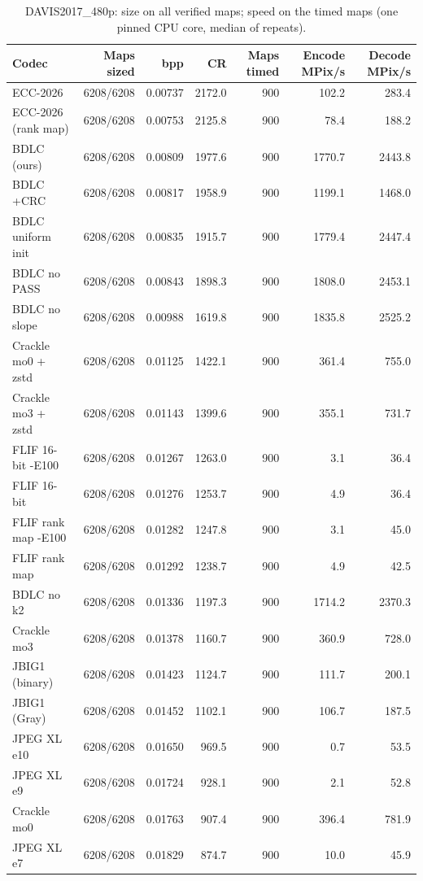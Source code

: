 \begin{table}[t]
\centering
\caption{DAVIS2017\_480p: size on all verified maps; speed on the timed maps (one pinned CPU core, median of repeats).}
\begin{tabular}{lrrrrrr}
\hline
Codec & Maps sized & bpp & CR & Maps timed & Encode MPix/s & Decode MPix/s \\
\hline
ECC-2026 & 6208/6208 & 0.00737 & 2172.0 & 900 & 102.2 & 283.4 \\
ECC-2026 (rank map) & 6208/6208 & 0.00753 & 2125.8 & 900 & 78.4 & 188.2 \\
BDLC (ours) & 6208/6208 & 0.00809 & 1977.6 & 900 & 1770.7 & 2443.8 \\
BDLC +CRC & 6208/6208 & 0.00817 & 1958.9 & 900 & 1199.1 & 1468.0 \\
BDLC uniform init & 6208/6208 & 0.00835 & 1915.7 & 900 & 1779.4 & 2447.4 \\
BDLC no PASS & 6208/6208 & 0.00843 & 1898.3 & 900 & 1808.0 & 2453.1 \\
BDLC no slope & 6208/6208 & 0.00988 & 1619.8 & 900 & 1835.8 & 2525.2 \\
Crackle mo0 + zstd & 6208/6208 & 0.01125 & 1422.1 & 900 & 361.4 & 755.0 \\
Crackle mo3 + zstd & 6208/6208 & 0.01143 & 1399.6 & 900 & 355.1 & 731.7 \\
FLIF 16-bit -E100 & 6208/6208 & 0.01267 & 1263.0 & 900 & 3.1 & 36.4 \\
FLIF 16-bit & 6208/6208 & 0.01276 & 1253.7 & 900 & 4.9 & 36.4 \\
FLIF rank map -E100 & 6208/6208 & 0.01282 & 1247.8 & 900 & 3.1 & 45.0 \\
FLIF rank map & 6208/6208 & 0.01292 & 1238.7 & 900 & 4.9 & 42.5 \\
BDLC no k2 & 6208/6208 & 0.01336 & 1197.3 & 900 & 1714.2 & 2370.3 \\
Crackle mo3 & 6208/6208 & 0.01378 & 1160.7 & 900 & 360.9 & 728.0 \\
JBIG1 (binary) & 6208/6208 & 0.01423 & 1124.7 & 900 & 111.7 & 200.1 \\
JBIG1 (Gray) & 6208/6208 & 0.01452 & 1102.1 & 900 & 106.7 & 187.5 \\
JPEG XL e10 & 6208/6208 & 0.01650 & 969.5 & 900 & 0.7 & 53.5 \\
JPEG XL e9 & 6208/6208 & 0.01724 & 928.1 & 900 & 2.1 & 52.8 \\
Crackle mo0 & 6208/6208 & 0.01763 & 907.4 & 900 & 396.4 & 781.9 \\
JPEG XL e7 & 6208/6208 & 0.01829 & 874.7 & 900 & 10.0 & 45.9 \\

\end{tabular}
\end{table}
